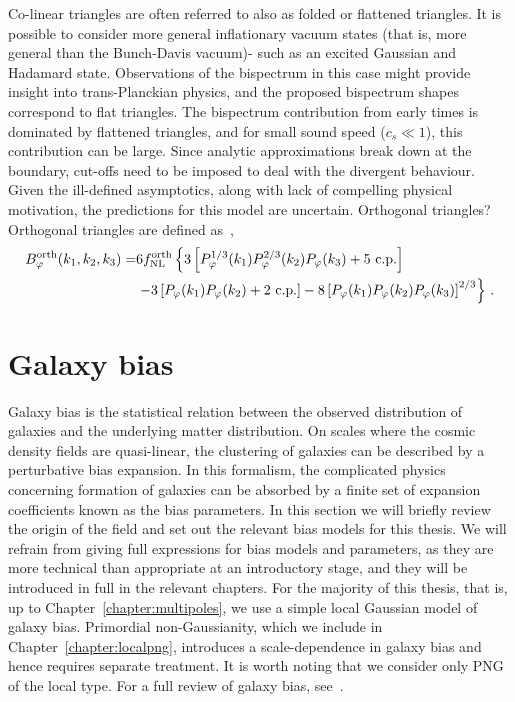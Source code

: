 Co-linear triangles are often referred to also as folded or flattened triangles. It is possible to consider more general inflationary vacuum states (that is, more general than the Bunch-Davis vacuum)- such as an excited Gaussian and Hadamard state. Observations of the bispectrum in this case might provide insight into trans-Planckian physics, and the proposed bispectrum shapes correspond to flat triangles. 
The bispectrum contribution from early times is dominated by flattened triangles, and for small sound speed ($c_s \ll 1$), this contribution can be large. Since analytic approximations break down at the boundary, cut-offs need to be imposed to deal with the divergent behaviour. Given the ill-defined asymptotics, along with lack of compelling physical motivation, the predictions for this model are uncertain.
Orthogonal triangles?~\cite{Senatore:2009gt}
Orthogonal triangles are defined as~\cite{Karagiannis:2018jdt}, 
\begin{align}
	B_\varphi^\mathrm{orth}(k_1,k_2,k_3) =& 6 \fnl^\mathrm{orth} \left\{ \vphantom{\left[ P_\varphi \right]^{1/3}} 3 \left[ P_\varphi^{1/3}(k_1) P_\varphi^{2/3}(k_2) P_\varphi(k_3) + 5\text{ c.p.} \right]  \right. \nonumber \\
	&\left. - 3 \left[ P_\varphi(k_1) P_\varphi(k_2) + 2\text{ c.p.} \right] - 8 \left[ P_\varphi(k_1) P_\varphi(k_2) P_\varphi(k_3) \right]^{2/3} \right\}\,.
\end{align}
\fi


\section{Galaxy bias}
\label{section:galaxybias}

Galaxy bias is the statistical relation between the observed distribution of galaxies and the underlying matter distribution. On scales where the cosmic density fields are quasi-linear, the clustering of galaxies can be described by a perturbative bias expansion. In this formalism, the complicated physics concerning formation of galaxies can be absorbed by a finite set of expansion coefficients known as the bias parameters. In this section we will briefly review the origin of the field and set out the relevant bias models for this thesis. We will refrain from giving full expressions for bias models and parameters, as they are more technical than appropriate at an introductory stage, and they will be introduced in full in the relevant chapters. For the majority of this thesis, that is, up to Chapter~\ref{chapter:multipoles}, we use a simple local Gaussian model of galaxy bias. Primordial non-Gaussianity, which we include in Chapter~\ref{chapter:localpng}, introduces a scale-dependence in galaxy bias and hence requires separate treatment. It is worth noting that we consider only PNG of the local type. For a full review of galaxy bias, see~\cite{Desjacques:2016bnm}.

